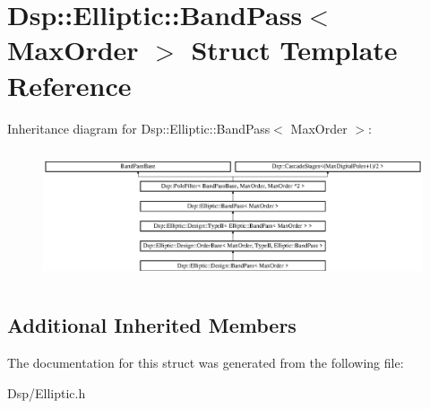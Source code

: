 \hypertarget{structDsp_1_1Elliptic_1_1BandPass}{\section{Dsp\-:\-:Elliptic\-:\-:Band\-Pass$<$ Max\-Order $>$ Struct Template Reference}
\label{structDsp_1_1Elliptic_1_1BandPass}
}
Inheritance diagram for Dsp\-:\-:Elliptic\-:\-:Band\-Pass$<$ Max\-Order $>$\-:\begin{figure}[H]
\begin{center}
\leavevmode
\includegraphics[height=3.897912cm]{structDsp_1_1Elliptic_1_1BandPass}
\end{center}
\end{figure}
\subsection*{Additional Inherited Members}


The documentation for this struct was generated from the following file\-:\begin{DoxyCompactItemize}
\item 
Dsp/Elliptic.\-h\end{DoxyCompactItemize}
